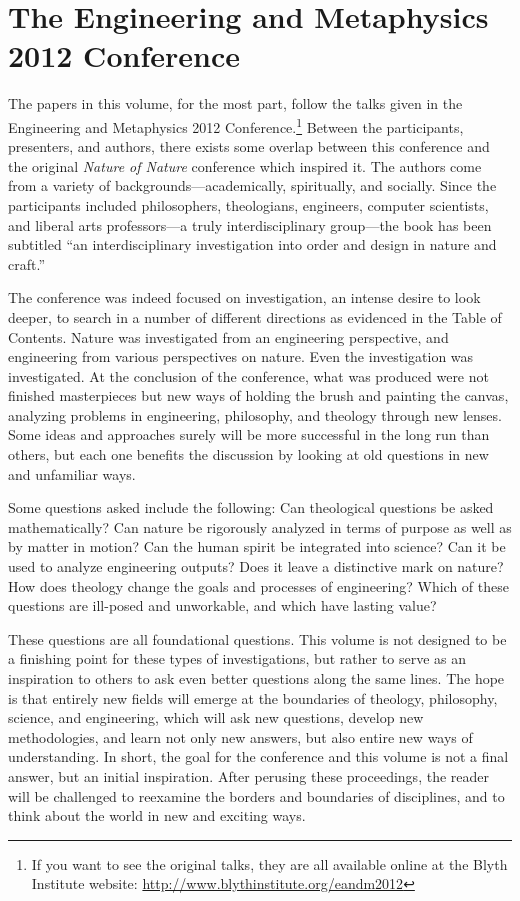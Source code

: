 \section{The Engineering and Metaphysics 2012 Conference}

The papers in this volume, for the most part, follow the talks given in the Engineering and Metaphysics 2012 Conference.\footnote{If you want to see the original talks, they are all available online at the Blyth Institute website: \url{http://www.blythinstitute.org/eandm2012}}  Between the participants, presenters, and authors, there exists some overlap between this conference and the original \textit{Nature of Nature} conference which inspired it.  The authors come from a variety of backgrounds---academically, spiritually, and socially.  Since the participants included philosophers, theologians, engineers, computer scientists, and liberal arts professors---a truly interdisciplinary group---the book has been subtitled ``an interdisciplinary investigation into order and design in nature and craft.''  

The conference was indeed focused on investigation, an intense desire to look deeper, to search in a number of different directions as evidenced in the Table of Contents.  Nature was investigated from an engineering perspective, and engineering from various perspectives on nature.  Even the investigation was investigated.  At the conclusion of the conference, what
was produced were not finished masterpieces but new ways of holding the brush and painting the canvas, analyzing problems in engineering, philosophy, and theology through new lenses.  Some ideas and approaches surely will be more successful in the long run than others, but each one benefits the discussion by looking at old questions in new and unfamiliar ways.

Some questions asked include the following: Can theological questions be asked mathematically?  Can nature be rigorously analyzed in terms of purpose as well as by matter in motion?  Can the human spirit be integrated into science?  Can it be used to analyze engineering outputs?  Does it leave a distinctive mark on nature?  How does theology change the goals and processes of engineering?  Which of these questions are ill-posed and unworkable, and which have lasting value?

These questions are all foundational questions.  This volume is not designed to be a finishing point for these types of investigations, but rather to serve as an inspiration to others to ask even better questions along the same lines.  The hope is that entirely new fields will emerge at the boundaries of theology, philosophy, science, and engineering, which will ask new questions, develop new methodologies, and learn not only new answers, but also entire new ways of understanding.  In short, the goal for the conference and this volume is not a final answer, but an initial inspiration.  After perusing these proceedings, the reader will be challenged to reexamine the borders and boundaries of disciplines, and to think about the world in new and exciting ways.

